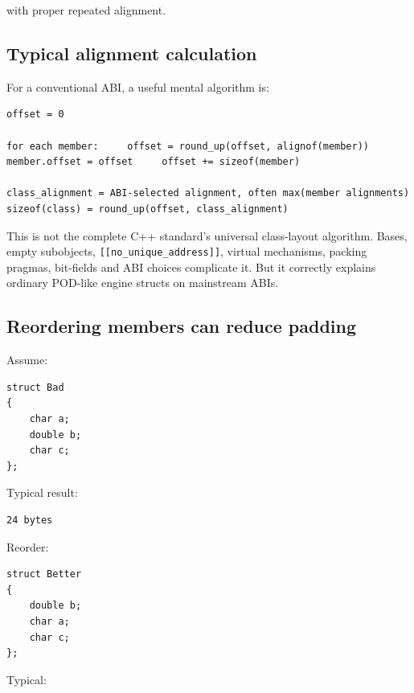 with proper repeated alignment.

\subsection{Typical alignment calculation}\label{01-foundations-i-ch003-typical-alignment-calculation}

\hypertarget{01-foundations-i-ch003-typical-alignment-calculation}{}

For a conventional ABI, a useful mental algorithm is:

\begin{verbatim}
offset = 0

for each member:     offset = round_up(offset, alignof(member))     member.offset = offset     offset += sizeof(member)

class_alignment = ABI-selected alignment, often max(member alignments)
sizeof(class) = round_up(offset, class_alignment)
\end{verbatim}

This is not the complete C++ standard's universal class-layout algorithm. Bases, empty subobjects, \texttt{{[}{[}no\_unique\_address{]}{]}}, virtual mechanisms, packing pragmas, bit-fields and ABI choices complicate it. But it correctly explains ordinary POD-like engine structs on mainstream ABIs.

\subsection{Reordering members can reduce padding}\label{01-foundations-i-ch003-reordering-members-can-reduce-padding}

\hypertarget{01-foundations-i-ch003-reordering-members-can-reduce-padding}{}

Assume:

\begin{verbatim}
struct Bad
{
    char a;
    double b;
    char c;
};
\end{verbatim}

Typical result:

\begin{verbatim}
24 bytes
\end{verbatim}

Reorder:

\begin{verbatim}
struct Better
{
    double b;
    char a;
    char c;
};
\end{verbatim}

Typical:

